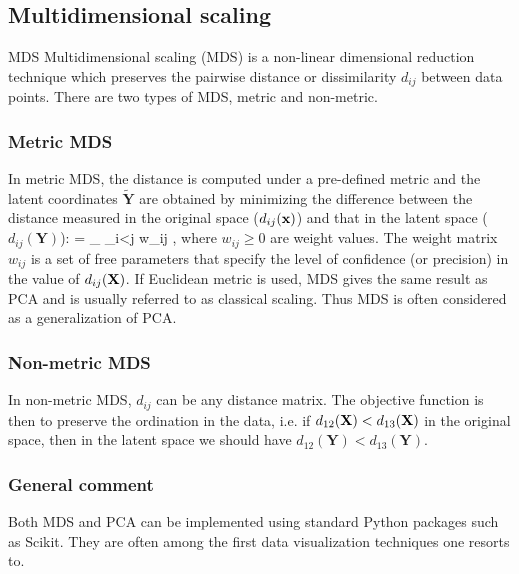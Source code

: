 \subsection{Multidimensional scaling}
\label{subsec:dimRedMDS}
\begin{mybox}{MDS}
	Multidimensional scaling (MDS) is a non-linear dimensional reduction technique which preserves the pairwise distance or dissimilarity $d_{ij}$ between data points. There are two types of MDS, metric and non-metric.
\end{mybox}
\subsubsection{Metric MDS}
In metric MDS, the distance is computed under a pre-defined metric and the latent coordinates $\tilde{\mathbf{Y}}$ are obtained by minimizing the difference between the distance measured in the original space ($d_{ij}(\mathbf{x})$) and that in the latent space ($d_{ij}(\mathbf{Y})$):
\be 
\label{eq:dimRedMDS}
 = \arg \min_{} \sum_{i<j} w_{ij} ,
\ee 
where $w_{ij}\geq 0$ are weight values. The weight matrix $w_{ij}$ is a set of free parameters that specify the level of confidence (or precision) in the value of $d_{ij}(\mathbf{X})$. If Euclidean metric is used, MDS gives the same result as PCA and is usually referred to as classical scaling. Thus MDS is often considered as a generalization of PCA.

\subsubsection{Non-metric MDS}
In non-metric MDS, $d_{ij}$ can be any distance matrix. The objective function is then to preserve the ordination in the data, i.e. if $d_{12}(\mathbf{X}) < d_{13}(\mathbf{X})$  in the original space, then in the latent space we should have $d_{12}(\mathbf{Y})< d_{13}(\mathbf{Y})$.

\subsubsection{General comment}
Both MDS and PCA can be implemented using standard Python packages such as Scikit. They are often among the first data visualization techniques one resorts to.


